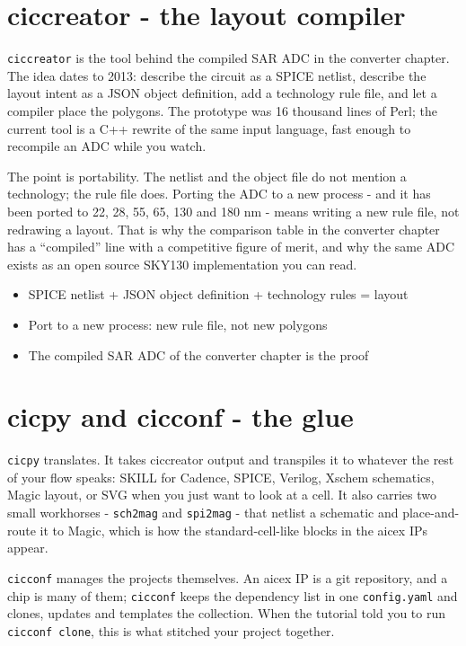 \section{ciccreator - the layout
compiler}\label{ciccreator---the-layout-compiler}

\texttt{ciccreator} is the tool behind the compiled SAR ADC in the
converter chapter. The idea dates to 2013: describe the circuit as a
SPICE netlist, describe the layout intent as a JSON object definition,
add a technology rule file, and let a compiler place the polygons. The
prototype was 16 thousand lines of Perl; the current tool is a C++
rewrite of the same input language, fast enough to recompile an ADC
while you watch.

The point is portability. The netlist and the object file do not mention
a technology; the rule file does. Porting the ADC to a new process - and
it has been ported to 22, 28, 55, 65, 130 and 180 nm - means writing a
new rule file, not redrawing a layout. That is why the comparison table
in the converter chapter has a ``compiled'' line with a competitive
figure of merit, and why the same ADC exists as an open source SKY130
implementation you can read.

\begin{itemize}
\tightlist
\item
  SPICE netlist + JSON object definition + technology rules = layout
\item
  Port to a new process: new rule file, not new polygons
\item
  The compiled SAR ADC of the converter chapter is the proof
\end{itemize}

\section{cicpy and cicconf - the
glue}\label{cicpy-and-cicconf---the-glue}

\texttt{cicpy} translates. It takes ciccreator output and transpiles it
to whatever the rest of your flow speaks: SKILL for Cadence, SPICE,
Verilog, Xschem schematics, Magic layout, or SVG when you just want to
look at a cell. It also carries two small workhorses - \texttt{sch2mag}
and \texttt{spi2mag} - that netlist a schematic and place-and-route it
to Magic, which is how the standard-cell-like blocks in the aicex IPs
appear.

\texttt{cicconf} manages the projects themselves. An aicex IP is a git
repository, and a chip is many of them; \texttt{cicconf} keeps the
dependency list in one \texttt{config.yaml} and clones, updates and
templates the collection. When the tutorial told you to run
\texttt{cicconf\ clone}, this is what stitched your project together.

